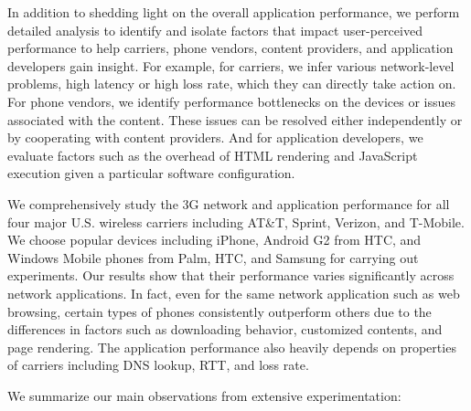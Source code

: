 In addition to shedding light on the overall application performance, we perform detailed analysis to identify and isolate
factors that impact user-perceived performance to help carriers,
phone vendors, content providers, and application developers gain 
insight. For example, for carriers, we infer various network-level 
problems, \eg high latency or high loss rate, which they can directly 
take action on. For phone vendors, we identify performance bottlenecks 
on the devices or issues associated with the content. These issues can
be resolved either independently or by cooperating with content 
providers. And for application developers, we evaluate factors such 
as the overhead of HTML rendering and JavaScript execution given a 
particular software configuration.

We comprehensively study the 3G network and application performance
for all four major U.S. wireless carriers including AT\&T, Sprint,
Verizon, and T-Mobile. We choose popular devices including iPhone,
Android G2 from HTC, and Windows Mobile phones from Palm, HTC, and 
Samsung for carrying out experiments. Our results show that their
performance varies significantly across network applications. In 
fact, even for the same network application such as web browsing, 
certain types of phones consistently outperform others due to the 
differences in factors such as downloading behavior, customized 
contents, and page rendering. The application performance also 
heavily depends on properties of carriers including DNS lookup, 
RTT, and loss rate.

We summarize our main observations from extensive experimentation:

